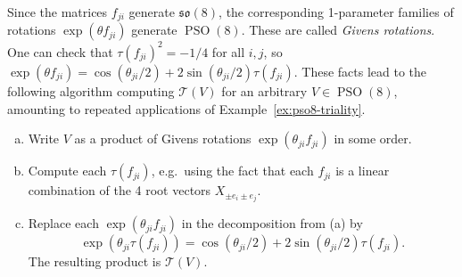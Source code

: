 \documentclass[reqno]{amsart}
\theoremstyle{definition} \newtheorem{example}[theorem]{Example}
\newcommand{\PSO}{\operatorname{PSO}}
\newcommand{\so}{\mathfrak{so}}
\newcommand{\T}{\mathcal{T}}
\newcommand{\TT}{\hat{\mathcal{T}}}
\renewcommand{\tt}{\hat{\tau}}
\begin{document}
Since the matrices $f_{ji}$ generate $\so(8)$, the corresponding 1-parameter families of rotations $\exp(\theta f_{ji})$ generate $\PSO(8)$. These are called \emph{Givens rotations}. One can check that $\tau(f_{ji})^2 = -1/4$ for all $i,j$, so $\exp(\theta f_{ji}) = \cos(\theta_{ji}/2) + 2\sin(\theta_{ji}/2) \tau(f_{ji})$. These facts lead to the following algorithm computing $\T(V)$ for an arbitrary $V \in \PSO(8)$, amounting to repeated applications of Example~\ref{ex:pso8-triality}.
\begin{enumerate}[(a)]
\item Write $V$ as a product of Givens rotations $\exp(\theta_{ji} f_{ji})$ in some order.
\item Compute each $\tau(f_{ji})$, e.g.\ using the fact that each $f_{ji}$ is a linear combination of the 4 root vectors $X_{\pm e_i \pm e_j}$.
\item Replace each $\exp(\theta_{ji} f_{ji})$ in the decomposition from (a) by 
\begin{equation*}
\exp(\theta_{ji} \tau(f_{ji})) = \cos(\theta_{ji}/2) + 2\sin(\theta_{ji}/2) \tau(f_{ji}).
\end{equation*}
The resulting product is $\T(V)$.
\end{enumerate}

%
\end{document}
